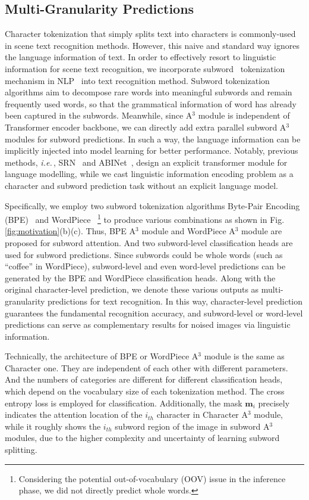 \documentclass[runningheads]{llncs}
\def\ie{\emph{i.e.}\,}
\begin{document}
\subsection{Multi-Granularity Predictions}
\label{sec:MGP}
Character tokenization that simply splits text into characters is commonly-used in scene text recognition methods.
However, this naive and standard way ignores the language information of text. 
In order to effectively resort to linguistic information for scene text recognition, we incorporate subword~\cite{subword} tokenization mechanism in NLP~\cite{BERT} into text recognition method. Subword tokenization algorithms aim to decompose rare words into meaningful subwords and remain frequently used words, so that the grammatical information of word has already been captured in the  subwords. Meanwhile, since A$^3$ module is independent of Transformer encoder backbone, we can directly add extra parallel subword A$^3$ modules for subword predictions. 
In such a way, the language information can be implicitly injected into model learning for better performance. Notably, previous methods, \ie, SRN~\cite{SRN} and ABINet~\cite{ABInet}, design an explicit transformer module for language modelling, while we cast linguistic information encoding problem as a character and subword prediction task without an explicit  language model. 

Specifically, we employ two subword tokenization algorithms Byte-Pair Encoding (BPE)~\cite{BPE} and WordPiece~\cite{wordpiece}
\footnote{Considering the potential out-of-vocabulary (OOV) issue in the inference phase, we did not directly predict whole words.} 
to produce various combinations as shown in Fig.\ref{fig:motivation}(b)(c). 
Thus, BPE A$^3$ module and WordPiece A$^3$ module are proposed for subword attention.
And two subword-level classification heads are used for subword predictions.
Since subwords could be whole words (such as ``coffee'' in WordPiece), subword-level and even word-level predictions can be generated by the BPE and WordPiece classification heads. 
Along with the original character-level prediction, we denote these various outputs as multi-granularity predictions for text recognition. In this way, character-level prediction guarantees the fundamental recognition accuracy, and subword-level or word-level predictions can serve as complementary results for noised images via linguistic information. 

Technically, the architecture of BPE or WordPiece A$^3$ module is the same as Character one. They are independent of each other with different parameters.
And the numbers of categories are different for different classification heads, which depend on the vocabulary size of each tokenization method.
The cross entropy loss is employed for classification.
Additionally, the mask $\mathbf{m}_{i}$ precisely indicates the attention location of the $i_{th}$ character in Character A$^3$ module, 
while it roughly shows the $i_{th}$ subword region of the image in subword A$^3$ modules, due to the higher complexity and uncertainty of learning subword splitting. 
\end{document}
